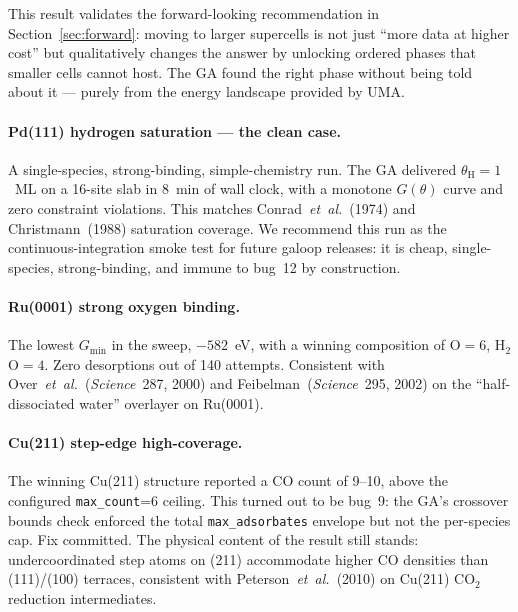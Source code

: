 \documentclass[11pt,letterpaper]{article}
\begin{document}
\vspace{4pt}
\noindent
This result validates the forward-looking recommendation in
Section~\ref{sec:forward}: moving to larger supercells is not just
``more data at higher cost'' but qualitatively changes the answer by
unlocking ordered phases that smaller cells cannot host. The GA found
the right phase without being told about it --- purely from the
energy landscape provided by UMA.

\paragraph{Pd(111) hydrogen saturation --- the clean case.} A
single-species, strong-binding, simple-chemistry run. The GA
delivered $\theta_{\text{H}} = 1$~ML on a 16-site slab in 8~min of
wall clock, with a monotone $G(\theta)$ curve and zero constraint
violations. This matches Conrad~\emph{et~al.}~(1974) and
Christmann~(1988) saturation coverage. We recommend this run as the
continuous-integration smoke test for future galoop releases: it is
cheap, single-species, strong-binding, and immune to bug~12 by
construction.

\paragraph{Ru(0001) strong oxygen binding.} The lowest $G_{\min}$ in
the sweep, $-582$~eV, with a winning composition of O$=6$,
H$_2$O$=4$. Zero desorptions out of 140 attempts. Consistent with
Over~\emph{et~al.}~(\emph{Science}~287, 2000) and Feibelman~(\emph{Science}~295,
2002) on the ``half-dissociated water'' overlayer on Ru(0001).

\paragraph{Cu(211) step-edge high-coverage.} The winning Cu(211)
structure reported a CO count of 9--10, above the configured
\texttt{max\_count}=6 ceiling. This turned out to be bug~9: the GA's
crossover bounds check enforced the total \texttt{max\_adsorbates}
envelope but not the per-species cap. Fix committed. The physical
content of the result still stands: undercoordinated step atoms on
(211) accommodate higher CO densities than (111)/(100) terraces,
consistent with Peterson~\emph{et~al.}~(2010) on Cu(211) CO$_2$
reduction intermediates.
\end{document}
